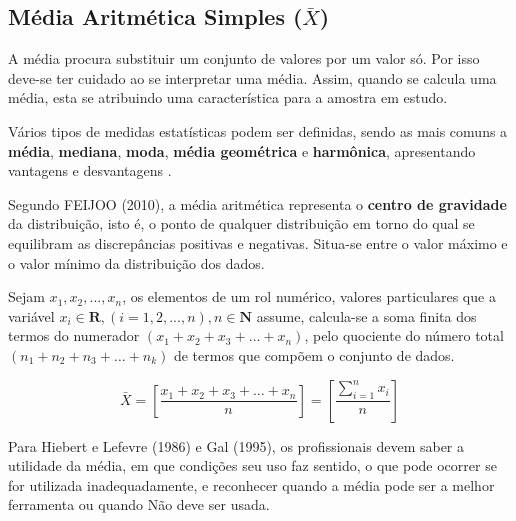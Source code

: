 \subsection{Média Aritmética Simples ($\bar{X}$)}

A média procura substituir um conjunto de valores por um valor só. Por isso
deve-se ter cuidado ao se interpretar uma média. Assim, quando se calcula uma média, esta se atribuindo
uma característica para a amostra em estudo.\vskip0.3cm

Vários tipos de medidas estatísticas podem ser definidas, sendo as mais comuns a \textbf{média}, \textbf{mediana}, \textbf{moda}, \textbf{média geométrica} e \textbf{harmônica}, apresentando vantagens e desvantagens
.\vskip0.3cm

Segundo FEIJOO (2010), a média aritmética representa o \textbf{centro de gravidade} da
distribuição, isto é, o ponto de qualquer distribuição em torno do qual se
equilibram as discrepâncias positivas e negativas. Situa-se entre o valor máximo e o valor mínimo da distribuição dos dados.\vskip0.3cm






Sejam $x_{1}, x_{2}, ..., x_{n}$, os elementos de um rol numérico, valores particulares que a variável $x_{i} \in \mathbf{R}, (i=1,2,...,n), n \in \mathbf{N} $ assume, calcula-se a soma finita dos termos do numerador $(x_{1}+x_{2}+x_{3}+\ldots+x_{n})$,  pelo quociente do número total $(n_{1}+n_{2}+n_{3}+\ldots+n_{k})$ de termos que compõem o conjunto de dados.\vskip0.3cm


\begin{equation}\label{media1}
\bar{X}= \left[ \frac{x_{1}+x_{2}+x_{3}+\ldots+x_{n}}{n} \right ] = \left[ \frac{\sum_{i=1}^{n}x_{i}}{n} \right ]
\end{equation}


Para Hiebert e Lefevre (1986) e Gal (1995), os profissionais devem saber a utilidade da média, em que condições seu uso faz sentido, o que pode ocorrer se for utilizada inadequadamente, e reconhecer quando a média pode ser a melhor ferramenta ou quando Não deve ser usada.





